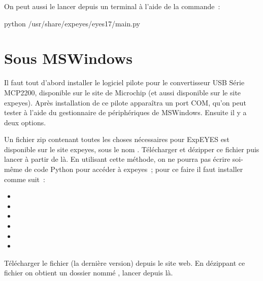 \documentclass[a4paper,12pt,french]{sphinxmanual}
\begin{document}
On peut aussi le lancer depuis un terminal à l’aide de la commande :

\begin{sphinxVerbatim}[commandchars=\\\{\}]
\PYGZdl{} python /usr/share/expeyes/eyes17/main.py
\end{sphinxVerbatim}


\section{Sous MSWindows}
\label{\detokenize{1.3:sous-mswindows}}
Il faut tout d’abord installer le logiciel pilote pour le convertisseur
USB Série MCP2200, disponible sur le site de Microchip (et aussi disponible
sur le site expeyes). Après installation de ce pilote apparaîtra un
port COM, qu’on peut tester à l’aide du gestionnaire de périphériques
de MSWindows. Ensuite il y a deux options.

Un fichier zip contenant toutes les choses nécessaires pour ExpEYES
est disponible sur le site expeyes, sous le nom .
Télécharger et dézipper ce fichier puis lancer 
à partir de là. En utilisant cette méthode, on ne pourra pas écrire
soi-même de code Python pour accéder à expeyes ; pour ce faire il
faut installer comme suit :
\begin{itemize}
\item {} 

\item {} 

\item {} 

\item {} 

\item {} 

\item {} 

\end{itemize}

Télécharger le fichier  (la dernière version)
depuis le site web. En dézippant ce fichier on obtient un dossier
nommé , lancer 
depuis là.
\end{document}
